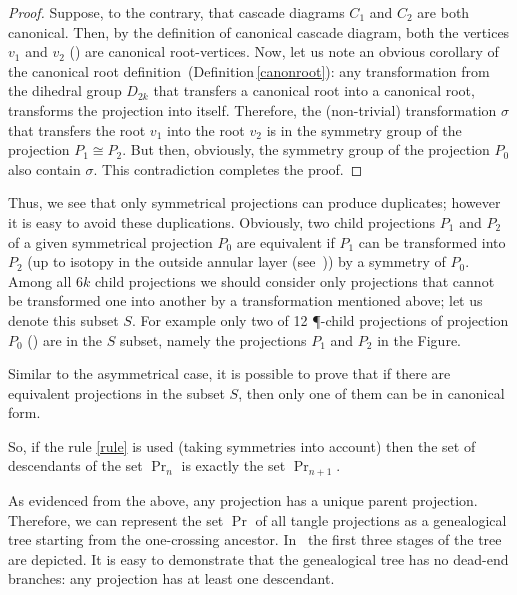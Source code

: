 \documentclass[12pt]{article}
\begin{document}

\begin{proof} Suppose, to the contrary, that cascade diagrams $C_1$ and $C_2$ are both canonical.
Then, by the definition of canonical cascade diagram, both the vertices $v_1$ and $v_2$
() are canonical root-vertices. Now, let us note an obvious corollary of the
canonical root definition~(Definition\,\ref{canonroot}): any transformation from the dihedral
group $D_{2k}$ that transfers a canonical root into a canonical root, transforms the projection
into itself. Therefore, the (non-trivial) transformation $\sigma$ that transfers the root $v_1$
into the root $v_2$ is in the symmetry group of the projection $P_1\cong P_2$. But then,
obviously, the symmetry group of the projection $P_0$ also contain $\sigma$. This contradiction
completes the proof.
\end{proof}

Thus, we see that only symmetrical projections can produce duplicates; however it is easy to
avoid these duplications. Obviously, two child projections $P_1$ and $P_2$ of a given symmetrical
projection $P_0$ are equivalent if $P_1$ can be transformed into $P_2$ (up to isotopy in the
outside annular layer (see~)) by a symmetry of $P_0$.
Among all $6k$ child projections we should consider only projections that cannot be transformed
one into another by a transformation mentioned above; let us denote this subset $S$. For example
only two of 12 \P-child projections of projection $P_0$ () are in the $S$
subset, namely the projections $P_1$ and $P_2$ in the Figure.


Similar to the asymmetrical case, it is possible to prove that if there are equivalent
projections in the subset $S$, then only one of them can be in canonical form.

So, if the rule \eqref{rule} is used (taking symmetries into account) then the set of descendants
of the set $\Pr_n$ is exactly the set $\Pr_{n+1}$.

As evidenced from the above, any projection has a unique parent projection. Therefore, we can
represent the set $\Pr$ of all tangle projections as a genealogical tree starting from the
one-crossing ancestor. In~ the first three stages of the tree are depicted. It
is easy to demonstrate that the genealogical tree has no dead-end branches: any projection has at
least one descendant.
\end{document}
